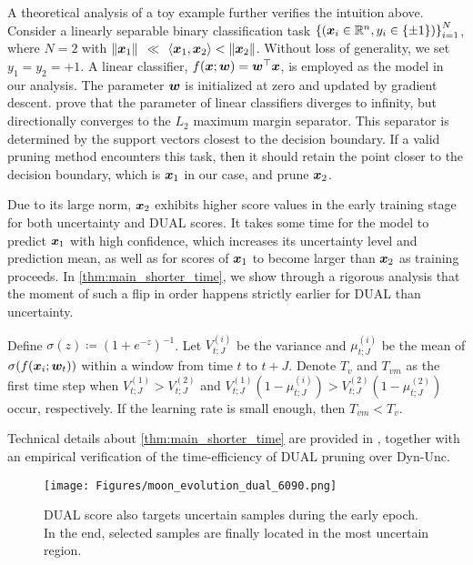 A theoretical analysis of a toy example further verifies the intuition above. Consider a linearly separable binary classification task $\left\{({\bm{x}}_i\in{\mathbb{R}}^n, y_i\in\{\pm1\})\right\}_{i=1}^N$, where $N=2$ with $\lVert {\bm{x}}_1\rVert$ $\ll$ $\langle {\bm{x}}_1, {\bm{x}}_2 \rangle < \lVert {\bm{x}}_2 \rVert$. Without loss of generality, we set $y_1 = y_2 = +1$.
A linear classifier, $f({\bm{x}}; {\bm{w}}) = {\bm{w}}^\top {\bm{x}}$, is employed as the model in our analysis. The parameter ${\bm{w}}$ is initialized at zero and updated by gradient descent. 
\citet{soudry2018implicit} prove that the parameter of linear classifiers diverges to infinity, but directionally converges to the $L_2$ maximum margin separator. This separator is determined by the support vectors closest to the decision boundary. If a valid pruning method encounters this task, then it should retain the point closer to the decision boundary, which is ${\bm{x}}_1$ in our case, and prune ${\bm{x}}_2$.

Due to its large norm, ${\bm{x}}_2$ exhibits higher score values in the early training stage for both uncertainty and DUAL scores.
It takes some time for the model to predict ${\bm{x}}_1$ with high confidence, which increases its uncertainty level and prediction mean, as well as for scores of ${\bm{x}}_1$ to become larger than ${\bm{x}}_2$ as training proceeds.
In \cref{thm:main_shorter_time}, we show through a rigorous analysis that the moment of such a flip in order happens strictly earlier for DUAL than uncertainty.

\begin{theorem}[Informal]
\label{thm:main_shorter_time}
    Define $\sigma(z) \coloneq (1+e^{-z})^{-1}$. Let $V_{t;J}^{(i)}$ be the variance and $\mu_{t;J}^{(i)}$ be the mean of $\sigma(f({\bm{x}}_i; {\bm{w}}_t))$ within a window from time $t$ to $t+J$. Denote $T_v$ and $T_{vm}$ as the first time step when $V_{t;J}^{(1)} > V_{t;J}^{(2)}$ and $V_{t;J}^{(1)}(1-\mu_{t;J}^{(i)}) > V_{t;J}^{(2)}(1-\mu_{t;J}^{(2)})$ occur, respectively. If the learning rate is small enough, then $T_{vm} < T_v$.
\end{theorem}


Technical details about \cref{thm:main_shorter_time} are provided in , together with an empirical verification of the time-efficiency of DUAL pruning over Dyn-Unc.

\begin{wrapfigure}[13]{r}{0.53\textwidth}
\vspace{-5mm}
    \begin{center}
        \texttt{[image: Figures/moon\_evolution\_dual\_6090.png]}
    \end{center}
    \caption{DUAL score also targets uncertain samples during the early epoch. In the end, selected samples are finally located in the most uncertain region.}
    \label{fig:moon_plot_dual}
\end{wrapfigure}

